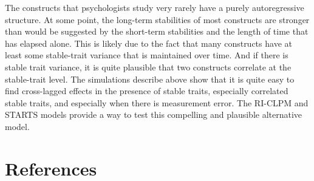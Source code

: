 \documentclass[
  english,
  man,floatsintext]{apa6}
\begin{document}
The constructs that psychologists study very rarely have a purely autoregressive structure. At some point, the long-term stabilities of most constructs are stronger than would be suggested by the short-term stabilities and the length of time that has elapsed alone. This is likely due to the fact that many constructs have at least some stable-trait variance that is maintained over time. And if there is stable trait variance, it is quite plausible that two constructs correlate at the stable-trait level. The simulations describe above show that it is quite easy to find cross-lagged effects in the presence of stable traits, especially correlated stable traits, and especially when there is measurement error. The RI-CLPM and STARTS models provide a way to test this compelling and plausible alternative model.

\hypertarget{references}{%
\section*{References}\label{references}}
\end{document}
